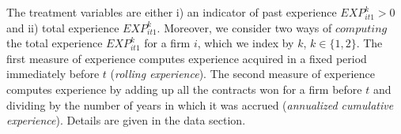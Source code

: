 
The treatment variables are either i) an indicator of past experience $EXP^k_{it1}>0$ and ii) total experience $EXP^k_{it1}$. Moreover, we consider two ways of $computing$ the total experience $EXP^k_{it1}$ for a firm $i$, which we index by $k$, $k\in \{1,2\}$. The first measure of experience computes experience acquired in a fixed period immediately before $t$ (\textit{rolling experience}). The second measure of experience computes experience by adding up all the contracts won for a firm before $t$ and dividing by the number of years in which it was accrued (\textit{annualized cumulative experience}). Details are given in the data section.








